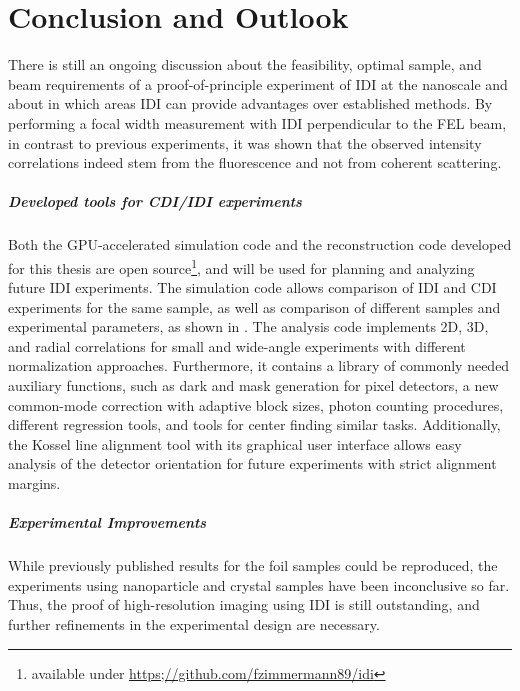 		\chapter{Conclusion and Outlook}
	There is still an ongoing discussion about the feasibility, optimal sample, and beam requirements of a proof-of-principle experiment of IDI at the nanoscale and about in which areas IDI can provide advantages over established methods. 
	By performing a focal width measurement with IDI perpendicular to the FEL beam, in contrast to previous experiments, it was shown that the observed intensity correlations indeed stem from the fluorescence and not from coherent scattering.

\paragraph{Developed tools for CDI/IDI experiments}
Both the GPU-accelerated simulation code and the reconstruction code developed for this thesis are open source\footnote{available under \url{https;//github.com/fzimmermann89/idi}}, and will be used for planning and analyzing future IDI experiments. The simulation code allows comparison of IDI and CDI experiments for the same sample, as well as comparison of different samples and experimental parameters, as shown in .
The analysis code implements 2D, 3D, and radial correlations for small and wide-angle experiments with different normalization approaches. Furthermore, it contains a library of commonly needed auxiliary functions, such as dark and mask generation for pixel detectors, a new common-mode correction with adaptive block sizes, photon counting procedures, different regression tools, and tools for center finding similar tasks.
Additionally, the Kossel line alignment tool with its graphical user interface allows easy analysis of the detector orientation for future experiments with strict alignment margins.

\paragraph{Experimental Improvements}
While previously published results for the foil samples could be reproduced, the experiments using nanoparticle and crystal samples have been inconclusive so far. Thus, the proof of high-resolution imaging using IDI is still outstanding, and further refinements in the experimental design are necessary.

